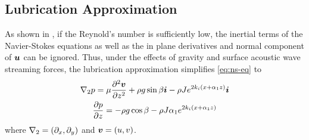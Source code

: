 \subsection{Lubrication Approximation}
As shown in \cite{kondic2003instabilities}, if the Reynold's number is sufficiently low, the inertial terms of the Navier-Stokes equations 
as well as the in plane derivatives and normal component of $\boldsymbol{u}$ can be ignored. Thus, under the effects of gravity and surface acoustic wave streaming forces, the lubrication approximation simplifies \cref{eq:ns-eq} to
\begin{gather}
    \nabla_2 p = \mu \frac{\partial^2 \boldsymbol{v}}{\partial z^2} + \rho g \sin\beta \boldsymbol{i} - \rho Je^{2k_i \left( x + \alpha_1 z \right)}\boldsymbol{i}
    \label{eq:pressure_grad}\\
    \frac{\partial p}{\partial z} = -\rho g \cos\beta - \rho J\alpha_1 e^{2k_i \left( x + \alpha_1 z \right)}
    \label{eq:pressure_z}
\end{gather}
where $\nabla_2 = \left( \partial_x, \partial_y \right)$ and 
$\boldsymbol{v} = \left( u, v \right)$. 

